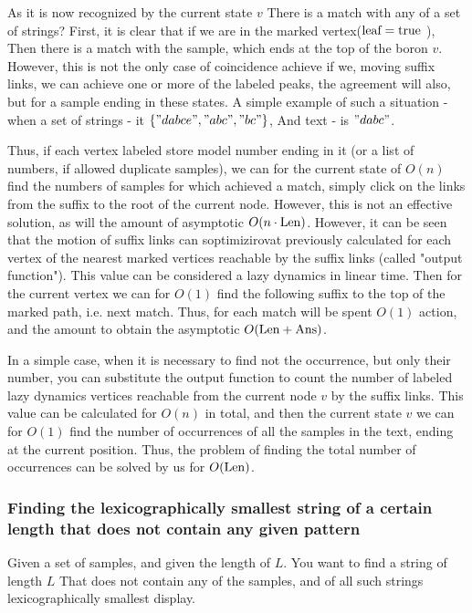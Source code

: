 As it is now recognized by the current state $v$ There is a match with any of a set of strings? First, it is clear that if we are in the marked vertex($\rm leaf = true$ ), Then there is a match with the sample, which ends at the top of the boron $v$. However, this is not the only case of coincidence achieve if we, moving suffix links, we can achieve one or more of the labeled peaks, the agreement will also, but for a sample ending in these states. A simple example of such a situation - when a set of strings - it $\{" dabce", "abc", "bc" \}$, And text - is $" dabc"$.

Thus, if each vertex labeled store model number ending in it (or a list of numbers, if allowed duplicate samples), we can for the current state of $O (n)$ find the numbers of samples for which achieved a match, simply click on the links from the suffix to the root of the current node. However, this is not an effective solution, as will the amount of asymptotic $O (n \cdot {\rm Len})$. However, it can be seen that the motion of suffix links can soptimizirovat previously calculated for each vertex of the nearest marked vertices reachable by the suffix links (called "output function"). This value can be considered a lazy dynamics in linear time. Then for the current vertex we can for $O (1)$ find the following suffix to the top of the marked path, i.e. next match. Thus, for each match will be spent $O (1)$ action, and the amount to obtain the asymptotic $O ({\rm Len + Ans})$.

In a simple case, when it is necessary to find not the occurrence, but only their number, you can substitute the output function to count the number of labeled lazy dynamics vertices reachable from the current node $v$ by the suffix links. This value can be calculated for $O (n)$ in total, and then the current state $v$ we can for $O (1)$ find the number of occurrences of all the samples in the text, ending at the current position. Thus, the problem of finding the total number of occurrences can be solved by us for $O ({\rm Len})$.

\subsubsection{ Finding the lexicographically smallest string of a certain length that does not contain any given pattern }

Given a set of samples, and given the length of $L$. You want to find a string of length $L$ That does not contain any of the samples, and of all such strings lexicographically smallest display.

